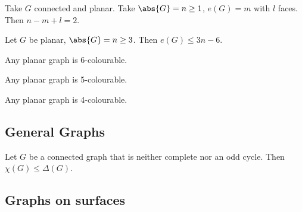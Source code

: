 \documentclass{article}
\begin{document}
\begin{nthm}\label{thm:23}
    Take $G$ connected and planar.
    Take $\abs{G} = n \geq 1$, $e(G) = m$ with $l$ faces.
    Then $n - m + l = 2$.
\end{nthm}

\begin{ncor}\label{cor:24}
    Let $G$ be planar, $\abs{G} = n \geq 3$. Then $e(G) \leq 3n-6$.
\end{ncor}

\begin{nprop}\label{prop:25}
    Any planar graph is 6-colourable.
\end{nprop}

\begin{nthm}\label{thm:26}
    Any planar graph is 5-colourable.
\end{nthm}

\begin{nthm}\label{thm:27}
    Any planar graph is 4-colourable.
\end{nthm}



\subsection{General Graphs}









{
}


{
}















\begin{nthm}\label{thm:28}
    Let $G$ be a connected graph that is neither complete nor an odd cycle.
    Then $\chi(G) \leq \Delta(G)$.
\end{nthm}

\subsection{Graphs on surfaces}
\end{document}

